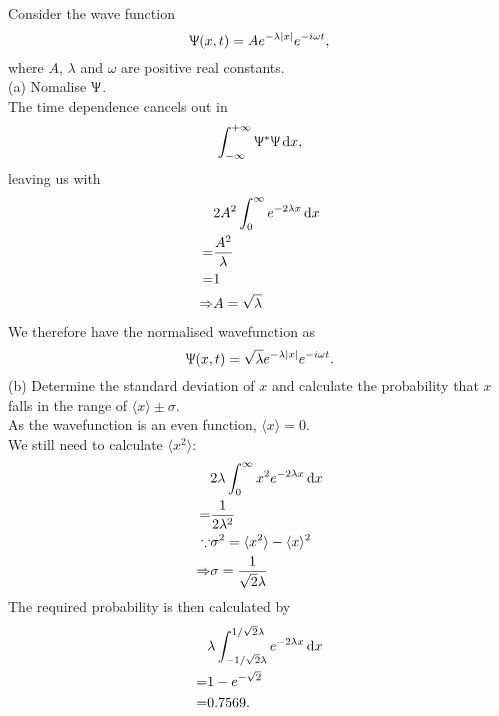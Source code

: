 \begin{wex}
Consider the wave function
\begin{equation}
\Uppsi(x,t)=Ae^{-\lambda|x|}e^{-i\omega t}, 
\end{equation}
where $A$, $\lambda$ and $\omega$ are positive real constants. \\
(a) Nomalise $\Uppsi$. \\
The time dependence cancels out in 
\begin{equation}
\intinf\ups^*\ups \dx, 
\end{equation}
leaving us with
\begin{equation}
\begin{aligned}
&2A^2\intinfp e^{-2\lambda x}\dx \\
=&\frac{A^2}{\lambda} \\
=&1 \\
\imp&A=\sqrt{\lambda} 
\end{aligned}
\end{equation}
We therefore have the normalised wavefunction as
\begin{equation}
\Uppsi(x,t)=\sqrt{\lambda}e^{-\lambda|x|}e^{-i\omega t}. 
\end{equation}
(b) Determine the standard deviation of $x$ and calculate the probability that $x$ falls in the range of $\langle x\rangle\pm\sigma$. \\
As the wavefunction is an even function, $\langle x\rangle=0$. \\
We still need to calculate $\langle x^2\rangle$: 
\begin{equation}
\begin{aligned}
&2\lambda\intinfp x^2 e^{-2\lambda x}\dx \\
=&\frac{1}{2\lambda^2} \\
\bec&\sigma^2=\langle x^2\rangle-\langle x\rangle^2 \\
\imp&\sigma=\frac{1}{\sqrt{2}\lambda}
\end{aligned}
\end{equation}
The required probability is then calculated by 
\begin{equation}
\begin{aligned}
&\lambda\int^{1/\sqrt{2}\lambda}_{-1/\sqrt{2}\lambda}e^{-2\lambda x}\dx \\
=&1-e^{-\sqrt{2}} \\
=&0.7569. 
\end{aligned}
\end{equation}
\end{wex}


